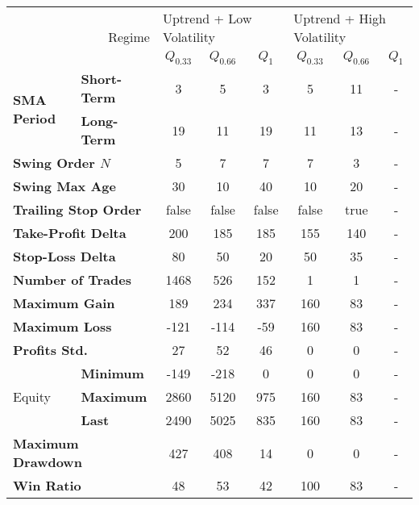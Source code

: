 \centering
\begin{tabular}{ll|cccccc}
    \toprule
    \multicolumn{2}{r|}{\multirow{2}{*}{Regime}} & \multicolumn{3}{l}{Uptrend + Low Volatility}     & \multicolumn{3}{l}{Uptrend + High Volatility}     \\
    \multicolumn{2}{r|}{} & $Q_{0.33}$ & $Q_{0.66}$ & $Q_{1}$ & $Q_{0.33}$ & $Q_{0.66}$ & $Q_{1}$ \\
    \midrule
    \multirow{2}{*}{\textbf{SMA Period}} & \textbf{Short-Term} & 3    & 5    & 3   & 5   & 11 & - \\
    & \textbf{Long-Term}  & 19   & 11   & 19  & 11  & 13 & - \\
    \multicolumn{2}{l|}{\textbf{Swing Order $N$}} & 5 & 7 & 7 & 7 & 3 & - \\
    \multicolumn{2}{l|}{\textbf{Swing Max Age}} & 30 & 10 & 40 & 10 & 20 & - \\
    \multicolumn{2}{l|}{\textbf{Trailing Stop Order}} & false & false & false & false & true & - \\
    \multicolumn{2}{l|}{\textbf{Take-Profit Delta}} & 200 & 185 & 185 & 155 & 140 & - \\
    \multicolumn{2}{l|}{\textbf{Stop-Loss Delta}} & 80 & 50 & 20 & 50 & 35 & - \\
    \midrule
    \multicolumn{2}{l|}{\textbf{Number of Trades}} & 1468 & 526 & 152 & 1 & 1 & - \\
    \multicolumn{2}{l|}{\textbf{Maximum Gain}} & 189 & 234 & 337 & 160 & 83 & - \\
    \multicolumn{2}{l|}{\textbf{Maximum Loss}} & -121 & -114 & -59 & 160 & 83 & - \\
    \multicolumn{2}{l|}{\textbf{Profits Std.}} & 27 & 52 & 46 & 0 & 0 & - \\
    \multirow{3}{*}{Equity}              & \textbf{Minimum}    & -149 & -218 & 0   & 0   & 0  & - \\
    & \textbf{Maximum}    & 2860 & 5120 & 975 & 160 & 83 & - \\
    & \textbf{Last}       & 2490 & 5025 & 835 & 160 & 83 & - \\
    \multicolumn{2}{l|}{\textbf{Maximum Drawdown}} & 427 & 408 & 14 & 0 & 0 & - \\
    \multicolumn{2}{l|}{\textbf{Win Ratio}} & 48 & 53 & 42 & 100 & 83 & - \\
    \bottomrule
\end{tabular}
